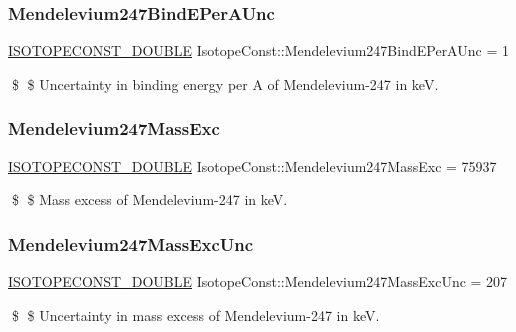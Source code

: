\subsubsection{\texorpdfstring{Mendelevium247\+Bind\+E\+Per\+A\+Unc}{Mendelevium247BindEPerAUnc}}
{\footnotesize\ttfamily \mbox{\hyperlink{group___isotope_const-_macros_ga8f45a7272ce02c0b4c65c44636ed719a}{I\+S\+O\+T\+O\+P\+E\+C\+O\+N\+S\+T\+\_\+\+D\+O\+U\+B\+LE}} Isotope\+Const\+::\+Mendelevium247\+Bind\+E\+Per\+A\+Unc = 1}

\$ \$ Uncertainty in binding energy per A of Mendelevium-\/247 in keV. \mbox{\label{group___isotope_const-_mendelevium-_md247_ga737feb1b15b2749e37bcdb96fde284e7}} 
\subsubsection{\texorpdfstring{Mendelevium247\+Mass\+Exc}{Mendelevium247MassExc}}
{\footnotesize\ttfamily \mbox{\hyperlink{group___isotope_const-_macros_ga8f45a7272ce02c0b4c65c44636ed719a}{I\+S\+O\+T\+O\+P\+E\+C\+O\+N\+S\+T\+\_\+\+D\+O\+U\+B\+LE}} Isotope\+Const\+::\+Mendelevium247\+Mass\+Exc = 75937}

\$ \$ Mass excess of Mendelevium-\/247 in keV. \mbox{\label{group___isotope_const-_mendelevium-_md247_ga1f8bdb43b2dcf7d8b2a0949e0e100ec8}} 
\subsubsection{\texorpdfstring{Mendelevium247\+Mass\+Exc\+Unc}{Mendelevium247MassExcUnc}}
{\footnotesize\ttfamily \mbox{\hyperlink{group___isotope_const-_macros_ga8f45a7272ce02c0b4c65c44636ed719a}{I\+S\+O\+T\+O\+P\+E\+C\+O\+N\+S\+T\+\_\+\+D\+O\+U\+B\+LE}} Isotope\+Const\+::\+Mendelevium247\+Mass\+Exc\+Unc = 207}

\$ \$ Uncertainty in mass excess of Mendelevium-\/247 in keV. \mbox{\label{group___isotope_const-_mendelevium-_md247_ga297ce1c64a346aec97e002071b73c4d0}} 
